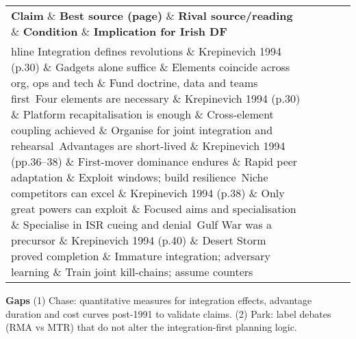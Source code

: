  
\begin{tabular}{p{3.2cm}p{4.2cm}p{3.6cm}p{3.2cm}p{4.2cm}}
	\textbf{Claim} \& \textbf{Best source (page)} \& \textbf{Rival source/reading} \& \textbf{Condition} \& \textbf{Implication for Irish DF}\\hline
	Integration defines revolutions \& Krepinevich 1994 (p.30) {\small } \& Gadgets alone suffice \& Elements coincide across org, ops and tech \& Fund doctrine, data and teams first\
	Four elements are necessary \& Krepinevich 1994 (p.30) {\small } \& Platform recapitalisation is enough \& Cross-element coupling achieved \& Organise for joint integration and rehearsal\
	Advantages are short-lived \& Krepinevich 1994 (pp.36–38) {\small } \& First-mover dominance endures \& Rapid peer adaptation \& Exploit windows; build resilience\
	Niche competitors can excel \& Krepinevich 1994 (p.38) {\small } \& Only great powers can exploit \& Focused aims and specialisation \& Specialise in ISR cueing and denial\
	Gulf War was a precursor \& Krepinevich 1994 (p.40) {\small } \& Desert Storm proved completion \& Immature integration; adversary learning \& Train joint kill-chains; assume counters\
\end{tabular}

\textbf{Gaps}
(1) Chase: quantitative measures for integration effects, advantage duration and cost curves post-1991 to validate claims.
(2) Park: label debates (RMA vs MTR) that do not alter the integration-first planning logic.

\parencite{RASSLER_2016
}

